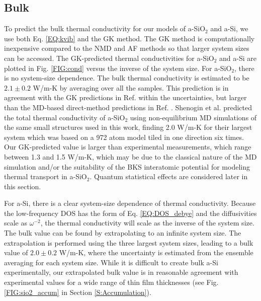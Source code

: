 \subsection{\label{S:Bulk}Bulk}

To predict the bulk thermal conductivity for our models of a-SiO$_2$ and 
a-Si, we use both Eq. \eqref{EQ:kvib} 
and the GK method. The GK method is computationally 
inexpensive compared to the NMD and AF methods so that 
larger system sizes can be accessed.  
The GK-predicted thermal conductivities for a-SiO$_2$ and a-Si 
are plotted in Fig. \ref{FIG:cond} versus the inverse of the system 
size. For a-SiO$_2$, there is no system-size dependence.  
The bulk thermal conductivity is estimated to be 
$2.1 \pm 0.2$ W/m-K by averaging over all the samples. This prediction 
is in agreement with the GK predictions in Ref. 
 within the uncertainties, 
but larger than the MD-based direct-method predictions in Ref. 
. 
Shenogin et al. predicted the total thermal 
conductivity of a-SiO$_2$ using 
non-equilibrium MD simulations of the same small structures 
used in this work, finding 2.0 W/m-K for their 
largest system which was based on a 972 atom model 
tiled in one direction six times.\cite{shenogin_predicting_2009}
Our GK-predicted value is larger than experimental 
measurements, which range between 
1.3 and 1.5 W/m-K,
\cite{cahill_lattice_1988,lee_heat_1997,
yamane_measurement_2002,regner_broadband_2013} 
which may be due to the classical nature of the MD simulation 
and/or the suitability of the BKS interatomic potential 
for modeling thermal transport in a-SiO$_2$.
\cite{jund_molecular-dynamics_1999,mcgaughey_thermal_2004}
Quantum statistical effects are considered later in this section. 

For a-Si, there is a clear system-size dependence of thermal 
conductivity. 
Because the low-frequency DOS has the form of Eq. \eqref{EQ:DOS_debye} 
and the diffusivities scale as $\omega^{-2}$,  
the thermal conductivity will scale as the inverse of the system size. 
The bulk value can be found by extrapolating to an infinite system size.
\cite{shiomi_thermal_2011,esfarjani_heat_2011,larkin_comparison_2012} 
The extrapolation is performed using the three largest 
system sizes,\cite{mfp_fn2} leading to a bulk value 
of $2.0 \pm 0.2$ W/m-K, where the uncertainty is 
estimated from the ensemble averaging for each system size. 
While it is difficult to create 
bulk a-Si experimentally,\cite{vacher_attenuation_1980} 
our extrapolated bulk value 
is in reasonable agreement with experimental values for a wide 
range of thin film thicknesses (see Fig. \ref{FIG:sio2_accum} in 
Section \ref{S:Accumulation}). 

